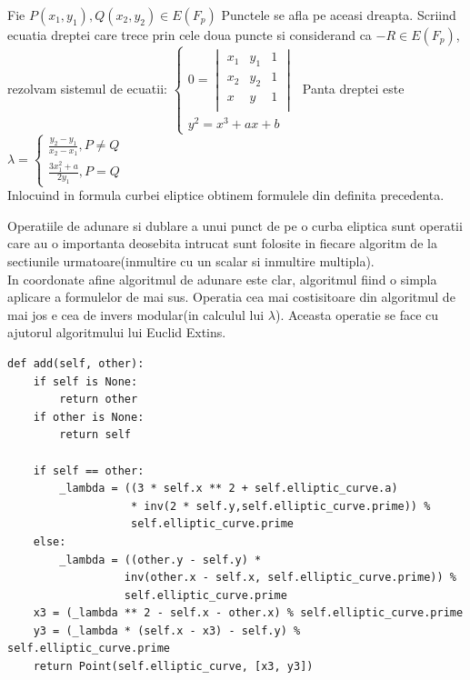 \begin{dem}
Fie $P(x_1, y_1), Q(x_2, y_2)\in E(F_p)$ Punctele se afla pe aceasi dreapta. Scriind ecuatia dreptei care trece prin cele doua puncte si considerand ca $-R\in E(F_p)$, rezolvam sistemul de ecuatii:
$\begin{cases} 
    0 = \begin{vmatrix}
			x_1 & y_1 & 1 \\ 
			x_2 & y_2 & 1 \\ 
			x & y & 1  \\ 
			\end{vmatrix} \\
    y^2 =  x^3 + ax + b
   \end{cases}$
   Panta dreptei este $\lambda = \begin{cases}
 \frac{y_2 - y_1}{x_2 - x_1}, P \neq Q \\ 
 \frac{3x^{2}_1 + a}{2y_1}, P = Q
 \end{cases}$
 \\Inlocuind in formula curbei eliptice obtinem formulele din definita precedenta.
\end{dem}

Operatiile de adunare si dublare a unui punct de pe o curba eliptica sunt operatii care au o importanta deosebita intrucat sunt folosite in fiecare algoritm de la sectiunile urmatoare(inmultire cu un scalar si inmultire multipla).
\\ In coordonate afine algoritmul de adunare este clar, algoritmul fiind o simpla aplicare a formulelor de mai sus. Operatia cea mai costisitoare din algoritmul de mai jos e cea de invers modular(in calculul lui $\lambda$). Aceasta operatie se face cu ajutorul algoritmului lui Euclid Extins.

\begin{lstlisting} 
def add(self, other):
	if self is None:
		return other
	if other is None:
		return self

	if self == other:
		_lambda = ((3 * self.x ** 2 + self.elliptic_curve.a) 
                   * inv(2 * self.y,self.elliptic_curve.prime)) % 
                   self.elliptic_curve.prime
	else:
		_lambda = ((other.y - self.y) * 
                  inv(other.x - self.x, self.elliptic_curve.prime)) %
                  self.elliptic_curve.prime
	x3 = (_lambda ** 2 - self.x - other.x) % self.elliptic_curve.prime
	y3 = (_lambda * (self.x - x3) - self.y) % self.elliptic_curve.prime
	return Point(self.elliptic_curve, [x3, y3])
\end{lstlisting}

